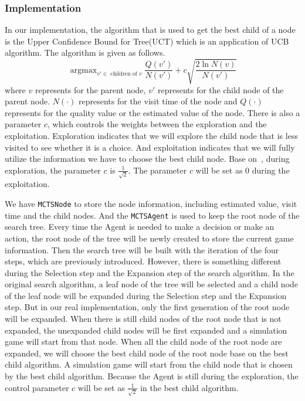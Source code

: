 \subsubsection{Implementation}
In our implementation, the algorithm that is used to get the best child of a node is the Upper Confidence Bound for Tree(UCT) which is an application of UCB algorithm. 
The algorithm is given as follows. 
\begin{equation*}
    \mathop{\arg\max}_{v' \in\textrm{ children of }v} \frac{Q(v')}{N(v')} + c\sqrt{\frac{2\ln N(v)}{N(v')}}
\end{equation*}
where $v$ represents for the parent node, $v'$ represents for the child node of the parent node. 
$N(\cdot)$ represents for the visit time of the node and $Q(\cdot)$ represents for the quality value or the estimated value of the node. 
There is also a parameter $c$, which controls the weights between the exploration and the exploitation. 
Exploration indicates that we will explore the child node that is less visited to see whether it is a choice. 
And exploitation indicates that we will fully utilize the information we have to choose the best child node. 
Base on~\cite{kocsis2006bandit}, during exploration, the parameter $c$ is $\frac{1}{\sqrt{2}}$. 
The parameter $c$ will be set as 0 during the exploitation. 

We have \verb|MCTSNode| to store the node information, including estimated value, visit time and the child nodes. 
And the \verb|MCTSAgent| is used to keep the root node of the search tree. 
Every time the Agent is needed to make a decision or make an action, the root node of the tree will be newly created to store the current game information. 
Then the search tree will be built with the iteration of the four steps, which are previously introduced. 
However, there is something different during the Selection step and the Expansion step of the search algorithm. 
In the original search algorithm, a leaf node of the tree will be selected and a child node of the leaf node will be expanded during the Selection step and the Expansion step. 
But in our real implementation, only the first generation of the root node will be expanded. 
When there is still child nodes of the root node that is not expanded, the unexpanded child nodes will be first expanded and a simulation game will start from that node. 
When all the child node of the root node are expanded, we will choose the best child node of the root node base on the best child algorithm. 
A simulation game will start from the child node that is chosen by the best child algorithm. 
Because the Agent is still during the exploration, the control parameter $c$ will be set as $\frac{1}{\sqrt{2}}$ in the best child algorithm. 

